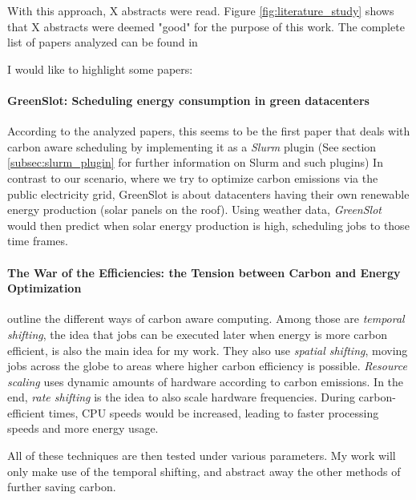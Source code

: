 With this approach, X abstracts were read. Figure \ref{fig:literature_study} shows that X abstracts  were deemed "good" for the purpose of this work. The complete list of papers analyzed can be found in 

I would like to highlight some papers:

\paragraph{GreenSlot: Scheduling energy consumption in green datacenters\cite{inigo_goiri_greenslot_2011}} According to the analyzed papers, this seems to be the first paper that deals with carbon aware scheduling by implementing it as a \emph{Slurm} plugin (See section \ref{subsec:slurm_plugin} for further information on Slurm and such plugins)
In contrast to our scenario, where we try to optimize carbon emissions via the public electricity grid, GreenSlot is about datacenters having their own renewable energy production (solar panels on the roof). Using weather data, \emph{GreenSlot} would then predict when solar energy production is high, scheduling jobs to those time frames.  

\paragraph{The War of the Efficiencies: the Tension between Carbon and Energy Optimization} \cite{hanafy_war_2023} outline the different ways of carbon aware computing. 
Among those are \emph{temporal shifting}, the idea that jobs can be executed later when energy is more carbon efficient, is also the main idea for my work. 
They also use \emph{spatial shifting}, moving jobs across the globe to areas where higher carbon efficiency is possible. 
\emph{Resource scaling} uses dynamic amounts of hardware according to carbon emissions.
In the end, \emph{rate shifting} is the idea to also scale hardware frequencies. During carbon-efficient times, CPU speeds would be increased, leading to faster processing speeds and more energy usage.

All of these techniques are then tested under various parameters. My work will only make use of the temporal shifting, and abstract away the other methods of further saving carbon.


